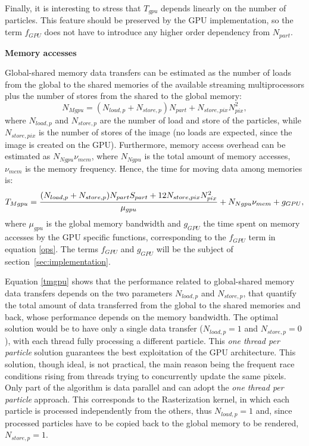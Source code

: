 \documentclass[11pt]{article}
\begin{document}
Finally, it is interesting to stress that $T_{gpu}$ depends linearly on the number of particles. 
This feature should be preserved by the GPU implementation, so the term 
$f_{GPU}$ does not have to introduce any higher order dependency from $N_{part}$. 

\medskip
\noindent
{\bf Memory accesses}

Global-shared memory data transfers can be estimated 
as the number of loads from the global to the shared memories of the available 
streaming multiprocessors plus the number of stores from the shared to the global memory: 
\begin{equation}
N_{Mgpu} = (N_{load,p} + N_{store,p}) N_{part} + N_{store,pix} N_{pix}^2,
\end{equation}
where $N_{load,p}$ and $N_{store,p}$ are the number of load and store of the 
particles, while $N_{store,pix}$ is the number of stores of the image (no loads 
are expected, since the image is created on the GPU). 
Furthermore, memory access overhead can be estimated as $N_{Ngpu} \nu_{mem}$,
where $N_{Ngpu}$ is the total amount of memory accesses, $\nu_{mem}$
is the memory frequency. 
Hence, the time for moving data among memories is:
\begin{equation}\label{tmgpu}
T_{Mgpu} = {(N_{load,p} + N_{store,p}) N_{part} S_{part}
+ 12 N_{store,pix} N_{pix}^2\over \mu_{gpu}}
+ N_{Ngpu} \nu_{mem} + g_{GPU},
\end{equation}
where $\mu_{gpu}$ is the global memory bandwidth
and $g_{GPU}$ the time 
spent on memory accesses by the GPU specific
functions, corresponding to the $f_{GPU}$ term in equation \eqref{ops}.
The terms $f_{GPU}$ and $g_{GPU}$ will be the subject of section~\ref{sec:implementation}.

Equation \eqref{tmgpu} shows that the performance related to global-shared memory 
data transfers
depends on the two parameters $N_{load,p}$ and $N_{store,p}$, that quantify the
total amount of data transferred from the global to the shared memories 
and back, whose performance depends on the memory bandwidth.
The optimal solution would be to have only a single data transfer
($N_{load,p} = 1$ and $N_{store,p} = 0$), with each thread
fully processing a different particle. This {\it one thread per particle} solution guarantees
the best exploitation of the GPU architecture.
This solution, though ideal, is not practical, the main reason being the frequent race conditions
rising from threads trying to concurrently update the same pixels.
Only part of the algorithm is data parallel and can adopt the {\it one thread per particle}
approach. This corresponds to the Rasterization kernel, in which each particle
is processed independently from the others, thus
$N_{load,p} = 1$ and, since processed particles
have to be copied back to the global memory to be rendered, $N_{store,p} = 1$.
\end{document}
